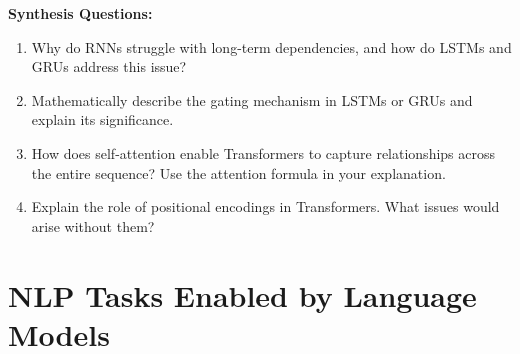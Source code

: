 \begin{questionbox}
\textbf{Synthesis Questions:}

\begin{enumerate}
    \item Why do RNNs struggle with long-term dependencies, and how do LSTMs and GRUs address this issue?
    \item Mathematically describe the gating mechanism in LSTMs or GRUs and explain its significance.
    \item How does self-attention enable Transformers to capture relationships across the entire sequence? Use the attention formula in your explanation.
    \item Explain the role of positional encodings in Transformers. What issues would arise without them?
\end{enumerate}

\end{questionbox}


\section{NLP Tasks Enabled by Language Models}

